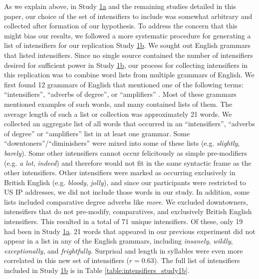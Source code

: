 \documentclass[10pt,letterpaper]{article}
\newcommand{\w}[1]{\emph{#1}}
\begin{document}
As we explain above, in Study \hyperref[sec:study1a]{1a} and the remaining studies detailed in this paper, our choice of the set of intensifiers to include was somewhat arbitrary and collected after formation of our hypothesis.
To address the concern that this might bias our results, we followed a more systematic procedure for generating a list of intensifiers for our replication Study \hyperref[sec:study1b]{1b}.
We sought out English grammars that listed intensifiers.
Since no single source contained the number of intensifiers desired for sufficient power in Study \hyperref[sec:study1b]{1b}, our process for collecting intensifiers in this replication was to combine word lists from multiple grammars of English.
We first found 12 grammars of English that mentioned one of the following terms: ``intensifiers'', ``adverbs of degree'', or ``amplifiers'' \cite{aarts_oxford_2014,douglas_longman_2000,declerck_comprehensive_1991,garner_chicago_2016,givon_english_1993,greenbaum_oxford_1996,huddleston_cambridge_2002,huddleston_introduction_1984,nelson_english:_2010,quirk_grammar_1972,quirk_students_1990,van_gelderen_introduction_2010}.
Most of these grammars mentioned examples of such words, and many contained lists of them.
The average length of such a list or collection was approximately 21 words.
We collected an aggregate list of all words that occurred in an ``intensifiers'', ``adverbs of degree'' or ``amplifiers'' list in at least one grammar.
Some ``downtoners''/``diminishers'' were mixed into some of these lists (e.g. \w{slightly}, \w{barely}).
Some other intensifiers cannot occur felicitously as simple pre-modifiers (e.g. \w{a lot}, \w{indeed}) and therefore would not fit in the same syntactic frame as the other intensifiers.
Other intensifiers were marked as occurring exclusively in British English (e.g. \w{bloody}, \w{jolly}), and since our participants were restricted to US IP addresses, we did not include those words in our study.
In addition, some lists included comparative degree adverbs like \w{more}.
We excluded downtowners, intensifiers that do not pre-modify, comparatives, and exclusively British English intensifiers.
This resulted in a total of 71 unique intensifiers.
Of these, only 19 had been in Study \hyperref[sec:study1a]{1a}.
21 words that appeared in our previous experiment did not appear in a list in any of the English grammars, including \w{insanely}, \w{wildly}, \w{exceptionally}, and \w{frightfully}.
Surprisal and length in syllables were even more correlated in this new set of intensifiers ($r=0.63$).
The full list of intensifiers included in Study \hyperref[sec:study1b]{1b} is in Table \hyperref[table:intensifiers_study1a]{\ref{table:intensifiers_study1b}}.
\end{document}

